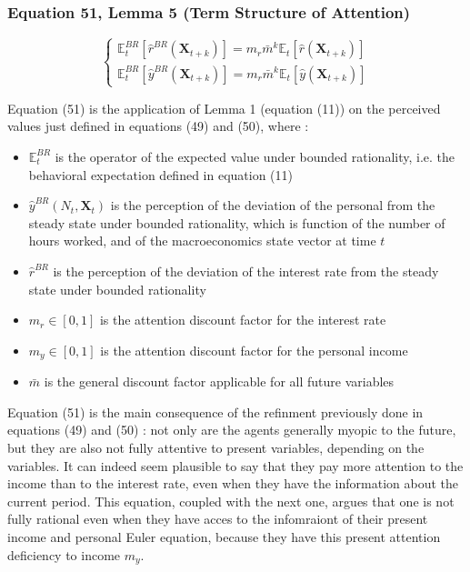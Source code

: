 \documentclass{article}
\begin{document}
\subsubsection*{Equation 51, Lemma 5 (Term Structure of Attention)}

\begin{equation}\tag{51}
    \begin{cases}
        \mathbb{E}_{t}^{BR}\left[\hat{r}^{BR}(\textbf{X}_{t+k})\right]=m_{r}\bar{m}^{k}\mathbb{E}_{t}\left[\hat{r}(\textbf{X}_{t+k})\right] \\
        \mathbb{E}_{t}^{BR}\left[\hat{y}^{BR}(\textbf{X}_{t+k})\right]=m_{r}\bar{m}^{k}\mathbb{E}_{t}\left[\hat{y}(\textbf{X}_{t+k})\right]
    \end{cases}
\end{equation}

Equation (51) is the application of Lemma 1 (equation (11)) on the perceived values just defined in equations (49) and (50), where : 
\begin{itemize}
    \item $\mathbb{E}_{t}^{BR}$ is the operator of the expected value under bounded rationality, i.e. the behavioral expectation defined in equation (11)
    \item $\hat{y}^{BR}(N_{t},\textbf{X}_{t})$ is the perception of the deviation of the personal from the steady state under bounded rationality, which is function of the number of hours worked, and of the macroeconomics state vector at time $t$
    \item $\hat{r}^{BR}$ is the perception of the deviation of the interest rate from the steady state under bounded rationality
    \item $m_{r}\in\left[0,1\right]$ is the attention discount factor for the interest rate
    \item $m_{y}\in\left[0,1\right]$ is the attention discount factor for the personal income
    \item $\bar{m}$ is the general discount factor applicable for all future variables
\end{itemize}

Equation (51) is the main consequence of the refinment previously done in equations (49) and (50) : not only are the agents generally myopic to the future, but they are also not fully attentive to present variables, depending on the variables.
It can indeed seem plausible to say that they pay more attention to the income than to the interest rate, even when they have the information about the current period.
This equation, coupled with the next one, argues that one is not fully rational even when they have acces to the infomraiont of their present income and personal Euler equation, because they have this present attention deficiency to income $m_{y}$.
\end{document}
